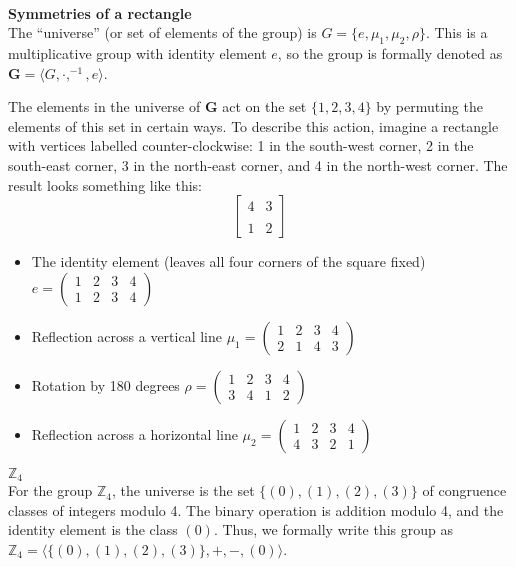 \documentclass[12pt,reqno]{amsart}
\newcommand{\Z}{\ensuremath{\mathbb{Z}}}
\newcommand{\bG}{\ensuremath{\mathbf{G}}}
\newcommand{\<}{\ensuremath{\langle}}
\renewcommand{\>}{\ensuremath{\rangle}}
\begin{document}
\begin{enumerate}
 
\medskip

\\[4pt]
{\bf Symmetries of a rectangle}\\
The ``universe'' (or set of elements of the group) is 
$G = \{e, \mu_1, \mu_2, \rho\}$.  This is a multiplicative group with identity
element $e$, so the group is formally denoted as $\bG= \<G, \cdot, ^{-1}, e\>$.

The elements in the universe of $\bG$ act on the set $\{1, 2, 3, 4\}$
by permuting the elements of this set in certain ways. To describe this action, imagine a
rectangle with vertices labelled counter-clockwise: 1 in the south-west corner,
2 in the south-east corner, 3 in the north-east corner, and 4 in the north-west
corner. The result looks something like this: 
\[
\begin{bmatrix} 4 & 3 \\
&\\
 1 & 2 \end{bmatrix}
\]

\begin{itemize}
\item 
The identity element (leaves all four corners of the square fixed)
$e = \begin{pmatrix} 1 & 2 & 3 & 4\\ 1 & 2 & 3 & 4 \end{pmatrix}$

\item Reflection across a vertical line
$\mu_1 = \begin{pmatrix}1 & 2 & 3 &4\\2 & 1 & 4 &3\end{pmatrix}$

\item Rotation by 180 degrees
$\rho = \begin{pmatrix}1 & 2 & 3 &4\\3 & 4 & 1 &2\end{pmatrix}$

\item Reflection across a horizontal line
$\mu_2 = \begin{pmatrix}1 & 2 & 3 &4\\4 & 3 & 2 &1\end{pmatrix}$
\end{itemize}


 $\Z_4$\\
For the group $\Z_4$, the universe is the set
$\{(0), (1), (2), (3)\}$  of congruence classes of integers modulo 4.  The
binary operation is addition modulo 4, and the identity element is the class $(0)$.
Thus, we formally write this group as $\Z_4 = \<\{(0), (1), (2), (3)\}, +, -, (0)\>$.


\end{enumerate}
\end{document}
